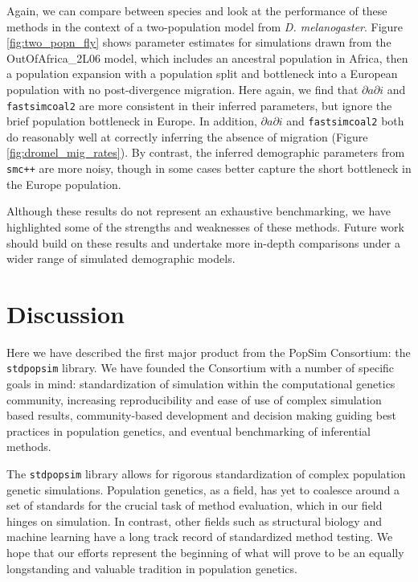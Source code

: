 \documentclass[12pt,halfline,a4paper]{ouparticle}
\newcommand{\stdpopsim}{\texttt{stdpopsim}\xspace}
\newcommand{\dadi}{$\partial a \partial i$\xspace}
\newcommand{\smcpp}{\texttt{smc++}\xspace}
\newcommand{\fastsimcoal}{\texttt{fastsimcoal2}\xspace}
\begin{document}
Again, we can compare between species and look at the performance of these methods in
the context of a two-population model from \emph{D. melanogaster}. Figure
\ref{fig:two_popn_fly} shows parameter estimates for simulations drawn from
the OutOfAfrica\_2L06 model, which includes
an ancestral population in Africa, then a population expansion with a population
split and bottleneck into a European population with no post-divergence migration.
Here again, we find that \dadi and \fastsimcoal are more consistent in their inferred
parameters, but ignore the brief population bottleneck in Europe. In addition, \dadi
and \fastsimcoal both do reasonably well at correctly inferring the absence of
migration (Figure \ref{fig:dromel_mig_rates}). By contrast, the inferred
demographic parameters from \smcpp are more noisy, though in some cases better
capture the short bottleneck in the Europe population.

Although these results do not represent an exhaustive benchmarking,
we have highlighted some of the strengths and weaknesses of these methods.
Future work should build on these results and undertake more in-depth comparisons
under a wider range of simulated demographic models.

\section*{Discussion}

Here we have described the first major product from the PopSim Consortium:
the \stdpopsim library. We have founded the Consortium with a number of specific goals in mind:
standardization of simulation within the computational genetics community,
increasing reproducibility and ease of use of complex simulation based results,
community-based development and decision making guiding best practices in population genetics,
and eventual benchmarking of inferential methods.

The \stdpopsim library allows for rigorous
standardization of complex population genetic simulations. Population genetics, as a field,
has yet to coalesce around a set of standards for the crucial task of method
evaluation, which in our field hinges on simulation. In contrast, other fields such as
structural biology \citep{moult1995large} and machine learning \citep{russakovsky2015imagenet} have a long track record
of standardized method testing. We hope that our efforts represent the beginning of what
will prove to be an equally longstanding and valuable tradition in population genetics.
\end{document}
